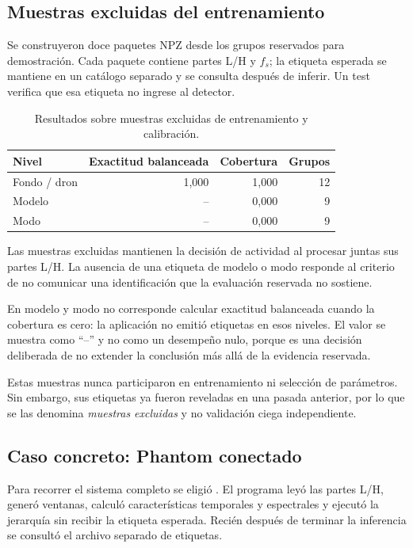 \documentclass[11pt,a4paper]{article}
\begin{document}
\subsection{Muestras excluidas del entrenamiento}

Se construyeron doce paquetes NPZ desde los grupos reservados para demostración. Cada
paquete contiene partes L/H y $f_s$; la etiqueta esperada se mantiene en un catálogo
separado y se consulta después de inferir. Un test verifica que esa etiqueta no ingrese al
detector.

\begin{table}[H]
\centering
\caption{Resultados sobre muestras excluidas de entrenamiento y calibración.}
\begin{tabular}{lrrr}
\toprule
Nivel & Exactitud balanceada & Cobertura & Grupos \\
\midrule
Fondo / dron & 1,000 & 1,000 & 12 \\
Modelo & -- & 0,000 & 9 \\
Modo & -- & 0,000 & 9 \\
\bottomrule
\end{tabular}
\end{table}

Las muestras excluidas mantienen la decisión de actividad al procesar juntas sus partes L/H.
La ausencia de una etiqueta de modelo o modo responde al criterio de no comunicar una
identificación que la evaluación reservada no sostiene.

En modelo y modo no corresponde calcular exactitud balanceada cuando la cobertura es cero:
la aplicación no emitió etiquetas en esos niveles. El valor se muestra como ``--'' y no como
un desempeño nulo, porque es una decisión deliberada de no extender la conclusión más allá
de la evidencia reservada.

Estas muestras nunca participaron en entrenamiento ni selección de parámetros. Sin
embargo, sus etiquetas ya fueron reveladas en una pasada anterior, por lo que se las
denomina \emph{muestras excluidas} y no validación ciega independiente.

\subsection{Caso concreto: Phantom conectado}

Para recorrer el sistema completo se eligió
. El programa leyó las partes L/H,
generó ventanas, calculó características temporales y espectrales y ejecutó la jerarquía sin recibir la
etiqueta esperada. Recién después de terminar la inferencia se consultó el archivo separado
de etiquetas.
\end{document}
